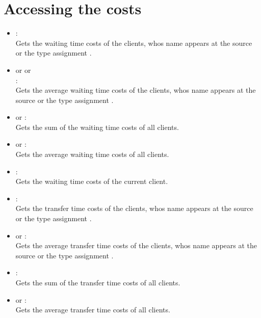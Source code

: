 \section{Accessing the costs}

\begin{itemize}

\item
{}:\\
Gets the waiting time costs of the clients, whos name appears at the source or the type assignment .  

\item
{} or  or\\
:\\
Gets the average waiting time costs of the clients, whos name appears at the source or the type assignment .

\item
{} or :\\
Gets the sum of the waiting time costs of all clients.

\item
{} or :\\
Gets the average waiting time costs of all clients.

\item
{}:\\
Gets the waiting time costs of the current client.

\item
{}:\\
Gets the transfer time costs of the clients, whos name appears at the source or the type assignment .

\item
{} or :\\
Gets the average transfer time costs of the clients, whos name appears at the source or the type assignment .

\item
{}:\\
Gets the sum of the transfer time costs of all clients.

\item
{} or :\\
Gets the average transfer time costs of all clients.


\end{itemize}
